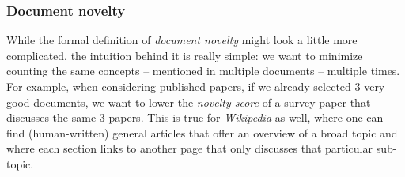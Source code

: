 \subsubsection{Document novelty}

While the formal definition of \emph{document novelty} might look a little more
complicated, the intuition behind it is really simple: we want to minimize
counting the same concepts -- mentioned in multiple documents -- multiple
times.
For example, when considering published papers, if we already selected \(3\)
very good documents, we want to lower the \emph{novelty score} of a survey
paper that discusses the same \(3\) papers.
This is true for \emph{Wikipedia} as well, where one can find (human-written)
general articles that offer an overview of a broad topic and where each section
links to another page that only discusses that particular sub-topic.

